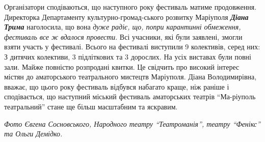 Організатори сподіваються, що наступного року фестиваль матиме  продовження.
Директорка Департаменту культурно-громад\hyp{}ського розвитку Маріуполя \emph{\textbf{Діана Трима}}
наголосила, що вона \emph{дуже радіє, що, попри карантинні обмеження, фестиваль все ж
вдалося провести}. Всі учасники, які були заявлені, змогли взяти участь у
фестивалі. Всього на фестивалі виступили 9 колективів, серед них: З дитячих
колективи, 3 підліткових та 3 дорослих. На усіх виставах були повні зали. Майже
повністю розпродані квитки. Це свідчить про високий інтерес містян до
аматорського театрального мистецтв Маріуполя. Діана Володимирівна, вважає, що
цього року фестиваль відбувся набагато краще, ніж раніше і сподівається, що
наступний міський фестиваль аматорських театрів \enquote{Ма\hyp{}ріуполь театральний} стане
ще більш масштабним та яскравим.

\emph{Фото Євгена Сосновського, Народного театру \enquote{Театроманія}, театру \enquote{Фенікс} та Ольги Демідко.}  

